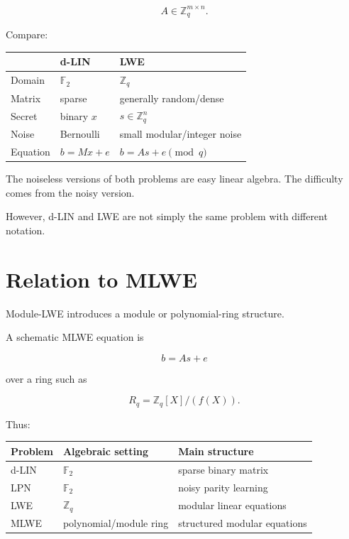 \documentclass[11pt,a4paper]{article}
\newcommand{\F}{\mathbb{F}}
\newcommand{\Z}{\mathbb{Z}}
\begin{document}
\begin{equation}
    A\in\Z_q^{m\times n}.
\end{equation}

Compare:

\begin{center}
\begin{tabular}{lll}
\toprule
 & d-LIN & LWE\\
\midrule
Domain & $\F_2$ & $\Z_q$\\
Matrix & sparse & generally random/dense\\
Secret & binary $x$ & $s\in\Z_q^n$\\
Noise & Bernoulli & small modular/integer noise\\
Equation & $b=Mx+e$ & $b=As+e\pmod q$\\
\bottomrule
\end{tabular}
\end{center}

The noiseless versions of both problems are easy linear algebra.
The difficulty comes from the noisy version.

However, d-LIN and LWE are not simply the same problem with different
notation.

\section{Relation to MLWE}

Module-LWE introduces a module or polynomial-ring structure.

A schematic MLWE equation is

\begin{equation}
    b=As+e
\end{equation}

over a ring such as

\begin{equation}
    R_q=\Z_q[X]/(f(X)).
\end{equation}

Thus:

\begin{center}
\begin{tabular}{lll}
\toprule
Problem & Algebraic setting & Main structure\\
\midrule
d-LIN & $\F_2$ & sparse binary matrix\\
LPN & $\F_2$ & noisy parity learning\\
LWE & $\Z_q$ & modular linear equations\\
MLWE & polynomial/module ring & structured modular equations\\
\bottomrule
\end{tabular}
\end{center}
\end{document}
